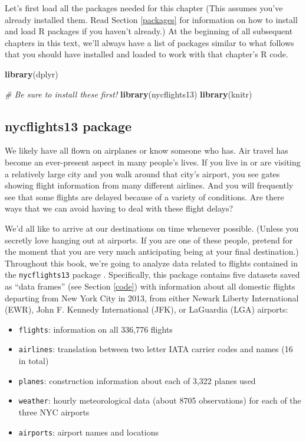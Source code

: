 \documentclass[12pt,]{krantz}
\makeatletter
\newenvironment{Shaded}{\begin{snugshade}}{\end{snugshade}}
\newcommand{\KeywordTok}[1]{\textcolor[rgb]{0.27,0.27,0.27}{\textbf{#1}}}
\newcommand{\CommentTok}[1]{\textcolor[rgb]{0.37,0.37,0.37}{\textit{#1}}}
\newcommand{\NormalTok}[1]{#1}
\providecommand{\tightlist}{%
  \setlength{\itemsep}{0pt}\setlength{\parskip}{0pt}}
\newenvironment{kframe}{%
\medskip{}
\setlength{\fboxsep}{.8em}
 \def\at@end@of@kframe{}%
 \ifinner\ifhmode%
  \def\at@end@of@kframe{\end{minipage}}%
  \begin{minipage}{\columnwidth}%
 \fi\fi%
 \def\FrameCommand##1{\hskip\@totalleftmargin \hskip-\fboxsep
 \colorbox{shadecolor}{##1}\hskip-\fboxsep
     \hskip-\linewidth \hskip-\@totalleftmargin \hskip\columnwidth}%
 \MakeFramed {\advance\hsize-\width
   \@totalleftmargin\z@ \linewidth\hsize
   \@setminipage}}%
 {\par\unskip\endMakeFramed%
 \at@end@of@kframe}
\renewenvironment{Shaded}{\begin{kframe}}{\end{kframe}}
\theoremstyle{definition}
\theoremstyle{definition}
\theoremstyle{definition}
\theoremstyle{remark}
\makeatother
\begin{document}
Let's first load all the packages needed for this chapter (This assumes
you've already installed them. Read Section \ref{packages} for
information on how to install and load R packages if you haven't
already.) At the beginning of all subsequent chapters in this text,
we'll always have a list of packages similar to what follows that you
should have installed and loaded to work with that chapter's R code.

\begin{Shaded}
\begin{Highlighting}[]
\KeywordTok{library}\NormalTok{(dplyr)}

\CommentTok{# Be sure to install these first!}
\KeywordTok{library}\NormalTok{(nycflights13)}
\KeywordTok{library}\NormalTok{(knitr)}
\end{Highlighting}
\end{Shaded}

\subsection{nycflights13 package}\label{nycflights13-package}

We likely have all flown on airplanes or know someone who has. Air
travel has become an ever-present aspect in many people's lives. If you
live in or are visiting a relatively large city and you walk around that
city's airport, you see gates showing flight information from many
different airlines. And you will frequently see that some flights are
delayed because of a variety of conditions. Are there ways that we can
avoid having to deal with these flight delays?

We'd all like to arrive at our destinations on time whenever possible.
(Unless you secretly love hanging out at airports. If you are one of
these people, pretend for the moment that you are very much anticipating
being at your final destination.) Throughout this book, we're going to
analyze data related to flights contained in the \texttt{nycflights13}
package \citep{R-nycflights13}. Specifically, this package contains five
datasets saved as ``data frames'' (see Section \ref{code}) with
information about all domestic flights departing from New York City in
2013, from either Newark Liberty International (EWR), John F. Kennedy
International (JFK), or LaGuardia (LGA) airports:

\begin{itemize}
\tightlist
\item
  \texttt{flights}: information on all 336,776 flights
\item
  \texttt{airlines}: translation between two letter IATA carrier codes
  and names (16 in total)
\item
  \texttt{planes}: construction information about each of 3,322 planes
  used
\item
  \texttt{weather}: hourly meteorological data (about 8705 observations)
  for each of the three NYC airports
\item
  \texttt{airports}: airport names and locations
\end{itemize}
\end{document}
